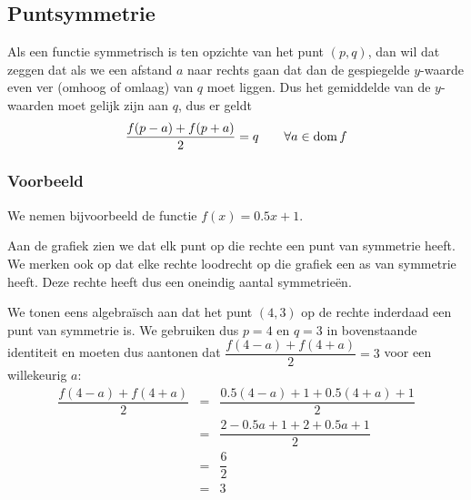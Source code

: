 \documentclass[12pt,a4paper,twoside]{article}
\begin{document}
\subsection{Puntsymmetrie}

Als een functie symmetrisch is ten opzichte van het punt $(p,q)$, dan wil dat zeggen dat als we een afstand $a$ naar rechts gaan dat dan de gespiegelde $y$-waarde even ver (omhoog of omlaag) van $q$ moet liggen. Dus het gemiddelde van de $y$-waarden moet gelijk zijn aan $q$, dus er geldt
$$\dfrac{f(p-a)+f(p+a)}{2}=q \qquad \forall a\in\dom f$$

\subsubsection*{Voorbeeld}

We nemen bijvoorbeeld de functie $f(x)=0.5x+1$.

\begin{center}
\end{center}

Aan de grafiek zien we dat elk punt op die rechte een punt van symmetrie heeft. We merken ook op dat elke rechte loodrecht op die grafiek een as van symmetrie heeft. Deze rechte heeft dus een oneindig aantal symmetrieën.

We tonen eens algebraïsch aan dat het punt $(4,3)$ op de rechte inderdaad een punt van symmetrie is. We gebruiken dus $p=4$ en $q=3$ in bovenstaande identiteit en moeten dus aantonen dat $\dfrac{f(4-a)+f(4+a)}{2}=3$ voor een willekeurig $a$:
\begin{eqnarray*}
  \dfrac{f(4-a)+f(4+a)}{2} &=& \dfrac{0.5(4-a)+1 + 0.5(4+a)+1}{2}\\
                           &=& \dfrac{2-0.5a + 1 + 2+0.5a + 1}{2}\\
                           &=& \dfrac{6}{2}\\
                           &=& 3
\end{eqnarray*}
\end{document}
